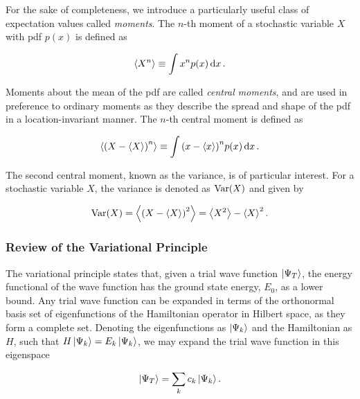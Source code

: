 For the sake of completeness, we introduce a particularly useful class of expectation values called \textit{moments}. The $n$-th moment of a stochastic variable $X$ with pdf $p(x)$ is defined as 

\begin{equation*}
    \expval{X^n} \equiv \int x^n p(x) \dd{x}.
\end{equation*}

Moments about the mean of the pdf are called \textit{central moments}, and are used in preference to ordinary moments as they describe the spread and shape of the pdf in a  location-invariant manner. The $n$-th central moment is defined as 

\begin{equation*}
    \expval{\qty(X - \expval{X})^n} \equiv \int \qty(x - \expval{x})^n p(x) \dd{x}.
\end{equation*}

The second central moment, known as the variance, is of particular interest. For a stochastic variable $X$, the variance is denoted as $\mathrm{Var} \qty(X)$ and given by 

\begin{equation}
    \mathrm{Var} \qty(X) =  \expval{\qty(X - \expval{X})^2} = \expval{X^2} - \expval{X}^2.
\end{equation}



\subsubsection{Review of the Variational Principle}\label{sec:variational_principle}

The variational principle states that, given a trial wave function $\ket{\Psi_T}$, the energy functional of the wave function has the ground state energy, $E_0$, as a lower bound. Any trial wave function can be expanded in terms of the orthonormal basis set of eigenfunctions of the Hamiltonian operator in Hilbert space, as they form a complete set. Denoting the eigenfunctions as $\ket{\Psi_k}$ and the Hamiltonian as $H$, such that $H\ket{\Psi_k}=E_k\ket{\Psi_k}$, we may expand the trial wave function in this eigenspace

\begin{equation*}
    \ket{\Psi_T} = \sum_{k}c_k\ket{\Psi_k}.
\end{equation*}

